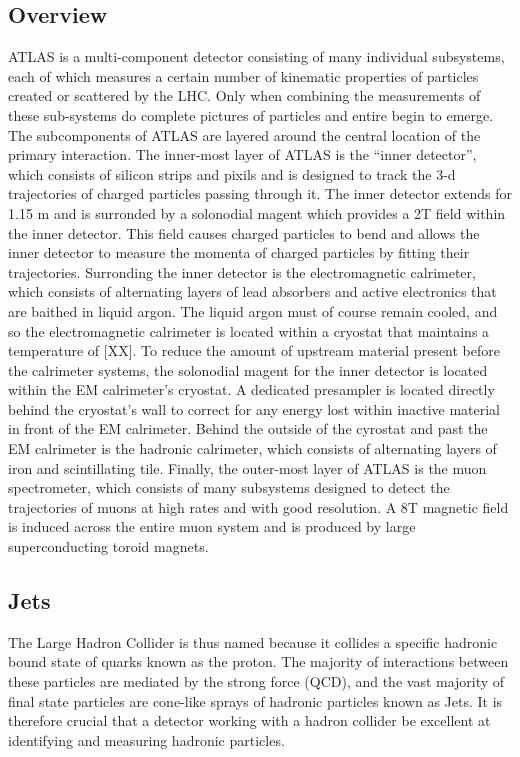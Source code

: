 \subsection{Overview}
ATLAS is a multi-component detector consisting of many individual subsystems, each of which measures a certain number of kinematic properties of particles created or scattered by the LHC.
Only when combining the measurements of these sub-systems do complete pictures of particles and entire begin to emerge.
The subcomponents of ATLAS are layered around the central location of the primary interaction.
The inner-most layer of ATLAS is the ``inner detector'', which consists of silicon strips and pixils and is designed to track the 3-d trajectories of charged particles passing through it.
The inner detector extends for 1.15 m and is surronded by a solonodial magent which provides a 2T field within the inner detector.
This field causes charged particles to bend and allows the inner detector to measure the momenta of charged particles by fitting their trajectories.
Surronding the inner detector is the electromagnetic calrimeter, which consists of alternating layers of lead absorbers and active electronics that are baithed in liquid argon.
The liquid argon must of course remain cooled, and so the electromagnetic calrimeter is located within a cryostat that maintains a temperature of [XX].
To reduce the amount of upstream material present before the calrimeter systems, the solonodial magent for the inner detector is located within the EM calrimeter's cryostat.
A dedicated presampler is located directly behind the cryostat's wall to correct for any energy lost within inactive material in front of the EM calrimeter.
Behind the outside of the cyrostat and past the EM calrimeter is the hadronic calrimeter, which consists of alternating layers of iron and scintillating tile.
Finally, the outer-most layer of ATLAS is the muon spectrometer, which consists of many subsystems designed to detect the trajectories of muons at high rates and with good resolution. 
A 8T magnetic field is induced across the entire muon system and is produced by large superconducting toroid magnets.


\subsection{Jets}
The Large Hadron Collider is thus named because it collides a specific hadronic bound state of quarks known as the proton.
The majority of interactions between these particles are mediated by the strong force (QCD), and the vast majority of final state particles are cone-like sprays of hadronic particles known as Jets.
It is therefore crucial that a detector working with a hadron collider be excellent at identifying and measuring hadronic particles.


